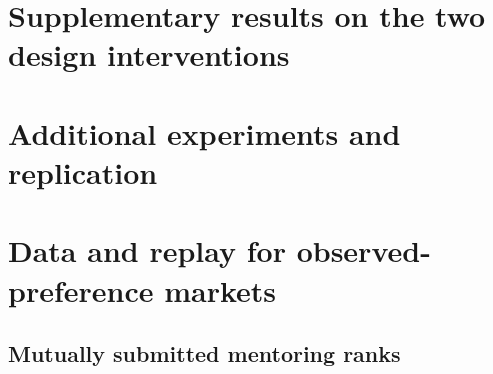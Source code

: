 \documentclass[format=acmsmall,review=false]{acmart}
\begin{document}
\section{Supplementary results on the two design interventions}\label{app:policy-detail}





\section{Additional experiments and replication}




\section{Data and replay for observed-preference markets}



\subsection{Mutually submitted mentoring ranks}










\end{document}
